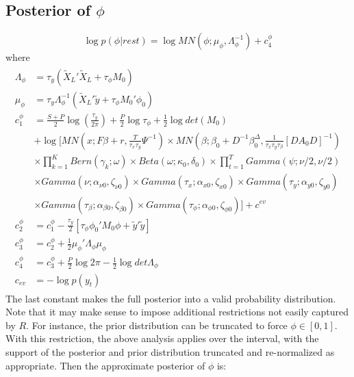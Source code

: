\documentclass[11pt]{article}
\begin{document}
\subsection{Posterior of $\phi$}
\begin{equation}
	\log p\left(\phi|rest\right) = \log MN\left(\phi;\mu_{\phi},\Lambda_{\phi}^{-1}\right)+c_{4}^{\phi}
\end{equation}
where
\begin{align*}
\begin{split}
	\Lambda_{\phi}	&=	\tau_{y}\left(\tilde{X}_{L}'\tilde{X}_{L}+\tau_{\phi}M_{0}\right)\\
	\mu_{\phi} 	&=	\tau_{y}\Lambda_{\phi}^{-1}\left(\tilde{X}_{L}'\tilde{y}+\tau_{\phi}M_{0}'\phi_{0}\right)\\
	c_{1}^{\phi}	&=	\frac{S+P}{2}\log\left(\frac{\tau_{y}}{2\pi}\right)+\frac{P}{2}\log\tau_{\phi}+\frac{1}{2}\log det\left(M_{0}\right)\\
				&+\log\Bigg[MN\left(x;F\beta+r,\frac{T}{\tau_{x}\tau_{y}}\Psi^{-1}\right)\times MN\left(\beta;\beta_{0}+D^{-1}\beta_{0}^{\Delta},\frac{1}{\tau_{x}\tau_{y}\tau_{\beta}}\left[DA_{0}D\right]^{-1}\right)\\
				&\times\prod_{k=1}^{K}Bern\left(\gamma_{k};\omega\right)\times Beta\left(\omega;\kappa_{0},\delta_{0}\right)\times\prod_{t=1}^{T}Gamma\left(\psi;\nu/2,\nu/2\right)\\
				&\times Gamma\left(\nu;\alpha_{\nu0},\zeta_{\nu0}\right)\times Gamma\left(\tau_{x};\alpha_{x0},\zeta_{x0}\right)\times Gamma\left(\tau_{y};\alpha_{y0},\zeta_{y0}\right)\\
				&\times Gamma\left(\tau_{\beta};\alpha_{\beta0},\zeta_{\beta0}\right)\times Gamma\left(\tau_{\phi};\alpha_{\phi0},\zeta_{\phi0}\right)\Bigg]+c^{ev}\\
	c_{2}^{\phi}	&=	c_{1}^{\phi}-\frac{\tau_{y}}{2}\left[\tau_{\phi}\phi_{0}'M_{0}\phi+\tilde{y}'\tilde{y}\right]\\
	c_{3}^{\phi}	&= 	c_{2}^{\phi}+\frac{1}{2}\mu_{\phi}'\Lambda_{\phi}\mu_{\phi}\\
	c_{4}^{\phi}	&=	c_{3}^{\phi}+\frac{P}{2}\log2\pi-\frac{1}{2}\log det\Lambda_{\phi}\\
	c_{ev}		&=	-\log p\left(y_{t}\right)
\end{split}
\end{align*}
The last constant makes the full posterior into a valid probability distribution. \\

Note that it may make sense to impose additional restrictions not easily captured by $R$. For instance, the prior distribution can be truncated to force $\phi\in\left[0,1\right]$. With this restriction, the above analysis applies over the interval, with the support of the posterior and prior distribution truncated and re-normalized as appropriate. Then the approximate posterior of $\phi$ is:
\end{document}
